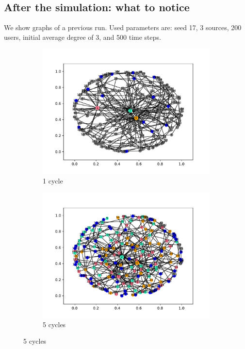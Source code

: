 \subsection{After the simulation: what to notice}\label{subsec:after}
We show graphs of a previous run. Used parameters are: seed 17, 3 sources,
200 users, initial average degree of 3, and 500 time steps.\\
\begin{figure}[htpb]
  \centering
  \begin{subfigure}[t]{.45\textwidth}
    \centering
    \includegraphics[trim={1cm .5cm 1cm 1cm}, clip, width=\linewidth]{img/pdf/plot-0001.pdf} 
    \caption{1 cycle}
    \label{fig:1}
  \end{subfigure}
  \begin{subfigure}[t]{.45\textwidth}
    \centering
    \includegraphics[trim={1cm .5cm 1cm 1cm}, clip, width=\linewidth]{img/pdf/plot-0005.pdf} 
    \caption{5 cycles}
    \label{fig:5}
  \end{subfigure}


\end{figure}
